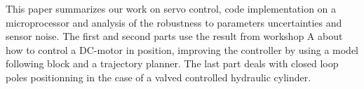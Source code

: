 This paper summarizes our work on servo control, code implementation on a microprocessor and analysis of the robustness to parameters uncertainties and sensor noise. The first and second parts use the result from workshop A about how to control a DC-motor in position, improving the controller by using a model following block and a trajectory planner. The last part deals with closed loop poles positionning in the case of a valved controlled hydraulic cylinder.